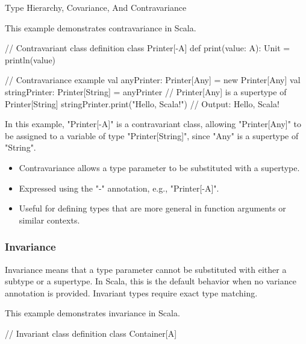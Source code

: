 \begin{notes}{Type Hierarchy, Covariance, And Contravariance}
    \begin{highlight}[Contravariance]
    
        This example demonstrates contravariance in Scala.
    
    \begin{code}[Scala]
    // Contravariant class definition
    class Printer[-A] {
        def print(value: A): Unit = println(value)
    }
    
    // Contravariance example
    val anyPrinter: Printer[Any] = new Printer[Any]
    val stringPrinter: Printer[String] = anyPrinter  // Printer[Any] is a supertype of Printer[String]
    stringPrinter.print("Hello, Scala!")  // Output: Hello, Scala!
    \end{code}
    
        In this example, "Printer[-A]" is a contravariant class, allowing "Printer[Any]" to be assigned to a variable of type "Printer[String]", since "Any" is a supertype of "String".
    
        \begin{itemize}
            \item Contravariance allows a type parameter to be substituted with a supertype.
            \item Expressed using the "-" annotation, e.g., "Printer[-A]".
            \item Useful for defining types that are more general in function arguments or similar contexts.
        \end{itemize}
    
    \end{highlight}
    
    \subsubsection*{Invariance}
    
    Invariance means that a type parameter cannot be substituted with either a subtype or a supertype. In Scala, this is the default behavior when no variance annotation is provided. Invariant types 
    require exact type matching.
    
    \begin{highlight}[Invariance]
    
        This example demonstrates invariance in Scala.
    
    \begin{code}[Scala]
    // Invariant class definition
    class Container[A]
    

\end{code}
\end{highlight}
\end{notes}
